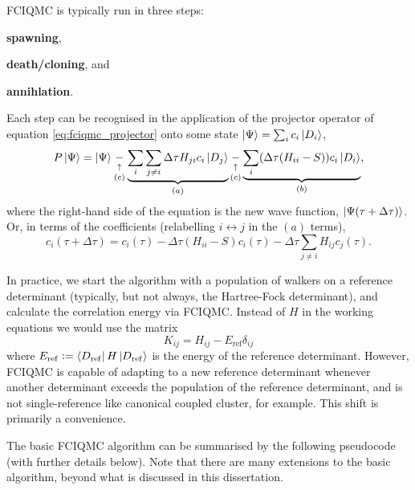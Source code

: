 \gls{FCIQMC} is typically run in three steps:
\begin{enumerate*}[label=(\alph*), itemjoin={\hspace{1em}}]
    \item \textbf{spawning},
    \item \textbf{death/cloning}, and
    \item \textbf{annihlation}.
\end{enumerate*}
Each step can be recognised in the application of the projector operator of equation \ref{eq:fciqmc_projector} onto some state
$\ket\Psi = \sum_i c_i\ket{D_i}$,
\begin{equation}
    \label{eq:fciqmc_projector_application}
    P\ket\Psi = \ket\Psi \underset{(c)}{\underset{\uparrow}{-}} \underbrace{\sum_{i}\sum_{j\neq i}\Delta\tau H_{ji}c_i\ket{D_j}}_{(a)} \underset{(c)}{\underset{\uparrow}{-}} \underbrace{\sum_i (\Delta\tau(H_{ii}-S))c_i\ket{D_i}}_{(b)},
\end{equation}
where the right-hand side of the equation is the new wave function, $\ket{\Psi(\tau+\Delta\tau)}$. Or, in terms of the coefficients (relabelling $i\leftrightarrow j$ in the $(a)$ terms),
\begin{equation}
    c_i(\tau+\Delta\tau) = c_i(\tau) - \Delta\tau(H_{ii}-S)c_i(\tau) - \Delta\tau\sum_{j\neq i}H_{ij}c_j(\tau).
\end{equation}

In practice, we start the algorithm with a population of walkers on a reference determinant (typically, but not always, the Hartree-Fock determinant), and calculate the correlation energy via FCIQMC. Instead of $H$ in the working equations we would use the matrix
\begin{equation}
    K_{ij} = H_{ij} - E_\mathrm{ref}\delta_{ij}
\end{equation}
where $E_\mathrm{ref}\mathrel{\mathop:}=\bra{D_\mathrm{ref}}H\ket{D_\mathrm{ref}}$ is the energy of the reference determinant. However, FCIQMC is capable of adapting to a new reference determinant whenever another determinant exceeds the population of the reference determinant, and is not single-reference like canonical coupled cluster, for example. This shift is primarily a convenience.

The basic \gls{FCIQMC} algorithm can be summarised by the following pseudocode (with further details below). Note that there are many extensions to the basic algorithm, beyond what is discussed in this dissertation.

